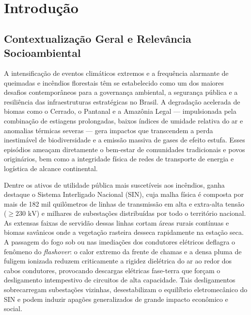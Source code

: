 \newpage
\section{Introdução}
\label{sc:introducao}

\subsection{Contextualização Geral e Relevância Socioambiental}
\label{sbc:contextualizacao}

A intensificação de eventos climáticos extremos e a frequência alarmante de queimadas e incêndios florestais têm se estabelecido como um dos maiores desafios contemporâneos para a governança ambiental, a segurança pública e a resiliência das infraestruturas estratégicas no Brasil. A degradação acelerada de biomas como o Cerrado, o Pantanal e a Amazônia Legal — impulsionada pela combinação de estiagens prolongadas, baixos índices de umidade relativa do ar e anomalias térmicas severas — gera impactos que transcendem a perda inestimável de biodiversidade e a emissão massiva de gases de efeito estufa. Esses episódios ameaçam diretamente o bem-estar de comunidades tradicionais e povos originários, bem como a integridade física de redes de transporte de energia e logística de alcance continental.

Dentre os ativos de utilidade pública mais suscetíveis aos incêndios, ganha destaque o Sistema Interligado Nacional (SIN), cuja malha física é composta por mais de 182 mil quilômetros de linhas de transmissão em alta e extra-alta tensão ($\ge 230\text{ kV}$) e milhares de subestações distribuídas por todo o território nacional. As extensas faixas de servidão dessas linhas cortam áreas rurais contínuas e biomas savânicos onde a vegetação rasteira desseca rapidamente na estação seca. A passagem do fogo sob ou nas imediações dos condutores elétricos deflagra o fenômeno do \textit{flashover}: o calor extremo da frente de chamas e a densa pluma de fuligem ionizada reduzem criticamente a rigidez dielétrica do ar ao redor dos cabos condutores, provocando descargas elétricas fase-terra que forçam o desligamento intempestivo de circuitos de alta capacidade. Tais desligamentos sobrecarregam subestações vizinhas, desestabilizam o equilíbrio eletromecânico do SIN e podem induzir apagões generalizados de grande impacto econômico e social.

